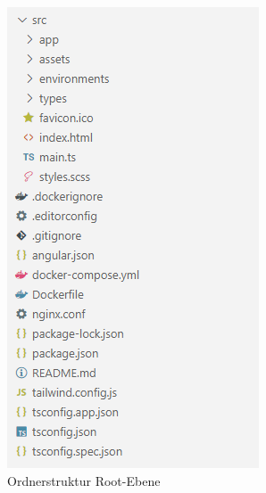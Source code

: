 \begin{figure}
    \centering
    \begin{subfigure}{.5\textwidth}
        \centering
        \includegraphics[width=.75\linewidth]{content/img/Empire/Frontend/Angular_Directory_Structure_Prototype_1.png}
        \caption{Ordnerstruktur Root-Ebene}
        \label{fig:AngularDirectoryStructurePrototype1}
    \end{subfigure}%
    \begin{subfigure}{.5\textwidth}
        \centering

\end{subfigure}
\end{figure}
